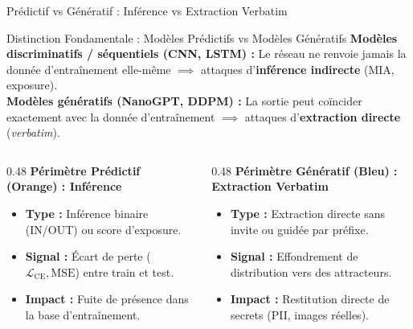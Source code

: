 \documentclass[aspectratio=169, 10pt, table]{beamer}
\begin{document}
\begin{frame}[t]{Prédictif vs Génératif : Inférence vs Extraction Verbatim}
    \begin{alertblock}{Distinction Fondamentale : Modèles Prédictifs vs Modèles Génératifs}
        \small
        \textbf{Modèles discriminatifs / séquentiels (CNN, LSTM) :} Le réseau ne renvoie jamais la donnée d'entraînement elle-même $\implies$ attaques d'\textbf{inférence indirecte} (MIA, exposure).\\
        \textbf{Modèles génératifs (NanoGPT, DDPM) :} La sortie peut coïncider exactement avec la donnée d'entraînement $\implies$ attaques d'\textbf{extraction directe} (\emph{verbatim}).
    \end{alertblock}

    \vspace{0.3cm}
    \begin{columns}[T]
        \begin{column}{0.48\textwidth}
            \textbf{\color{TSPblue}Périmètre Prédictif (Orange) : Inférence}
            \small
            \begin{itemize}
                \item \textbf{Type :} Inférence binaire (IN/OUT) ou score d'exposure.
                \item \textbf{Signal :} Écart de perte ($\mathcal{L}_{\text{CE}}, \text{MSE}$) entre train et test.
                \item \textbf{Impact :} Fuite de présence dans la base d'entraînement.
            \end{itemize}
        \end{column}

        \begin{column}{0.48\textwidth}
            \textbf{\color{TSPdark}Périmètre Génératif (Bleu) : Extraction Verbatim}
            \small
            \begin{itemize}
                \item \textbf{Type :} Extraction directe sans invite ou guidée par préfixe.
                \item \textbf{Signal :} Effondrement de distribution vers des attracteurs.
                \item \textbf{Impact :} Restitution directe de secrets (PII, images réelles).
            \end{itemize}
        \end{column}
    \end{columns}
\end{frame}
\end{document}
